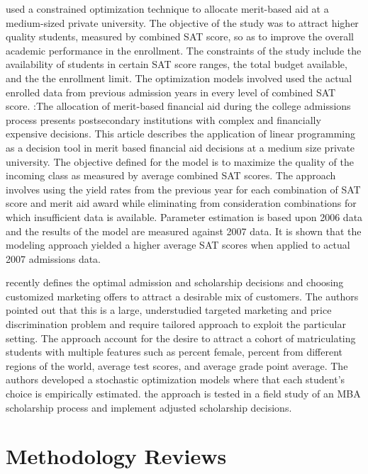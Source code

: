\documentclass[12pt,english]{report}
\begin{document}
\citet{Sugrue2010} used a constrained optimization technique to allocate
merit-based aid at a medium-sized private university. The objective of the
study was to attract higher quality students, measured by combined SAT score,
so as to improve the overall academic performance in the enrollment. The
constraints of the study include the availability of students in certain SAT
score ranges, the total budget available, and the the enrollment limit.  The
optimization models involved used the actual enrolled data from previous
admission years in every level of combined SAT score.  \citet{Sugrue2010}:The
allocation of merit-based financial aid during the college admissions process
presents postsecondary institutions with complex and financially expensive
decisions. This article describes the application of linear programming as a
decision tool in merit based financial aid decisions at a medium size private
university. The objective defined for the model is to maximize the quality of
the incoming class as measured by average combined SAT scores. The approach
involves using the yield rates from the previous year for each combination of
SAT score and merit aid award while eliminating from consideration combinations
for which insufficient data is available. Parameter estimation is based upon
2006 data and the results of the model are measured against 2007 data. It is
shown that the modeling approach yielded a higher average SAT scores when
applied to actual 2007 admissions data.

\citet{Belloni2012} recently defines the optimal admission and scholarship
decisions and choosing customized marketing offers to attract a desirable mix
of customers.  The authors pointed out that this is a large, understudied
targeted marketing and price discrimination problem and require tailored
approach  to exploit the particular setting.  The approach account for the
desire to attract a cohort of matriculating students with multiple features
such as percent female, percent from different regions of the world, average
test scores, and average grade point average.   The authors developed a
stochastic optimization models where that each student's choice is empirically
estimated. the approach is tested in a field study of an MBA scholarship
process and implement adjusted scholarship decisions.

\section{Methodology Reviews}
\end{document}

